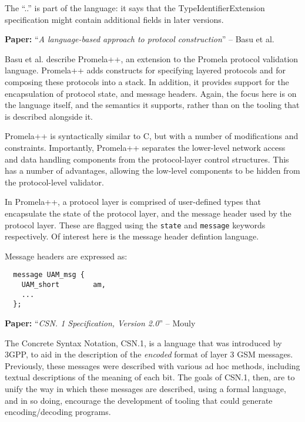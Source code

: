 \documentclass[10pt,a4paper]{article}
\newcommand{\paper}[3]{\vspace{4mm}\noindent\textbf{Paper:} ``\textit{#1}'' -- #2 \cite{#3}\vspace{3mm}}
\begin{document}
The ``..'' is part of the language: it says that the TypeIdentifierExtension specification
might contain additional fields in later versions.

\paper{A language-based approach to protocol construction}{Basu et al.}{basu1997language}

Basu et al. describe Promela++, an extension to the Promela protocol validation language.
Promela++ adds constructs for specifying layered protocols and for composing these
protocols into a stack. In addition, it provides support for the encapsulation of
protocol state, and message headers. Again, the focus here is on the language itself, and
the semantics it supports, rather than on the tooling that is described alongside it.

Promela++ is syntactically similar to C, but with a number of modifications and
constraints. Importantly, Promela++ separates the lower-level network access and data
handling components from the protocol-layer control structures. This has a number of
advantages, allowing the low-level components to be hidden from the protocol-level
validator.

In Promela++, a protocol layer is comprised of user-defined types that encapsulate the
state of the protocol layer, and the message header used by the protocol layer. These
are flagged using the \texttt{state} and \texttt{message} keywords respectively. Of 
interest here is the message header defintion language.

Message headers are expressed as:

\begin{verbatim}
  message UAM_msg {
    UAM_short        am,
    ...
  };
\end{verbatim}

\paper{CSN. 1 Specification, Version 2.0}{Mouly}{mouly1998csn}

The Concrete Syntax Notation, CSN.1, is a language that was introduced by 3GPP, to aid in
the description of the \emph{encoded} format of layer 3 GSM messages. Previously, these
messages were described with various ad hoc methods, including textual descriptions of the
meaning of each bit. The goals of CSN.1, then, are to unify the way in which these
messages are described, using a formal language, and in so doing, encourage the
development of tooling that could generate encoding/decoding programs.
\end{document}
